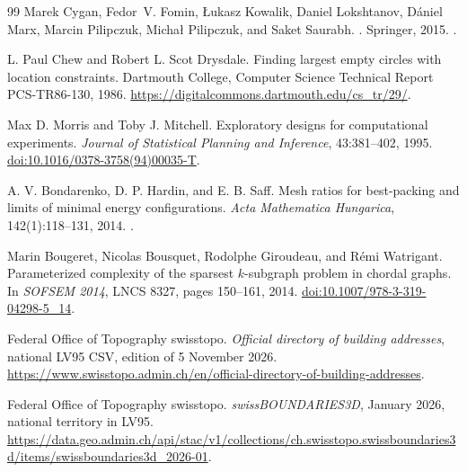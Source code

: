 \documentclass[a4paper,12pt]{article}
\numberwithin{equation}{section}
\begin{document}
\begin{thebibliography}{99}
Marek Cygan, Fedor~V. Fomin, {\L}ukasz Kowalik, Daniel Lokshtanov, D{\'a}niel
  Marx, Marcin Pilipczuk, Micha{\l} Pilipczuk, and Saket Saurabh.
.
\newblock Springer, 2015.
\newblock \href {https://doi.org/10.1007/978-3-319-21275-3}
  {}.

L. Paul Chew and Robert L. Scot Drysdale.
\newblock Finding largest empty circles with location constraints.
\newblock Dartmouth College, Computer Science Technical Report PCS-TR86-130, 1986.
\newblock \url{https://digitalcommons.dartmouth.edu/cs_tr/29/}.

Max D. Morris and Toby J. Mitchell.
\newblock Exploratory designs for computational experiments.
\newblock \emph{Journal of Statistical Planning and Inference}, 43:381--402, 1995.
\newblock \href{https://doi.org/10.1016/0378-3758(94)00035-T}{doi:10.1016/0378-3758(94)00035-T}.

A. V. Bondarenko, D. P. Hardin, and E. B. Saff.
\newblock Mesh ratios for best-packing and limits of minimal energy configurations.
\newblock \emph{Acta Mathematica Hungarica}, 142(1):118--131, 2014.
\newblock \href{https://doi.org/10.1007/s10474-013-0339-3}{}.

Marin Bougeret, Nicolas Bousquet, Rodolphe Giroudeau, and R\'emi Watrigant.
\newblock Parameterized complexity of the sparsest $k$-subgraph problem in chordal graphs.
\newblock In \emph{SOFSEM 2014}, LNCS 8327, pages 150--161, 2014.
\newblock \href{https://doi.org/10.1007/978-3-319-04298-5_14}{doi:10.1007/978-3-319-04298-5\_14}.

Federal Office of Topography swisstopo.
\newblock \emph{Official directory of building addresses}, national LV95 CSV,
edition of 5 November 2026.
\newblock \url{https://www.swisstopo.admin.ch/en/official-directory-of-building-addresses}.

Federal Office of Topography swisstopo.
\newblock \emph{swissBOUNDARIES3D}, January 2026, national territory in LV95.
\newblock \url{https://data.geo.admin.ch/api/stac/v1/collections/ch.swisstopo.swissboundaries3d/items/swissboundaries3d_2026-01}.
\end{thebibliography}
\end{document}
